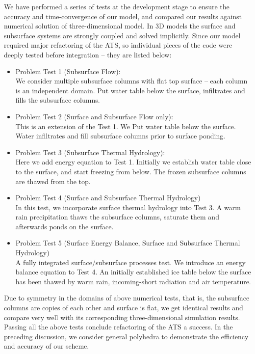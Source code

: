 \documentclass[review]{elsarticle}
\begin{document}
We have performed a series of tests at the development stage to ensure the accuracy and time-convergence of our model, and compared our results against numerical solution of three-dimensional model. In 3D models the surface and subsurface systems are strongly coupled and solved implicitly. Since our model required major refactoring of the ATS, so individual pieces of the code were deeply tested before integration -- they are listed below:
\begin{itemize}
\item{ Problem Test 1 (Subsurface Flow): \\
We consider multiple subsurface columns with flat top surface -- each column is an independent domain. Put water table below the surface, infiltrates and fills the subsurface columns.
}
\item{ Problem Test 2 (Surface and Subsurface Flow only): \\
This is an extension of the Test 1. We Put water table below the surface. Water infiltrates and fill subsurface columns prior to surface ponding. 
}

\item{ Problem Test 3 (Subsurface Thermal Hydrology): \\
Here we add energy equation to Test 1. Initially we establish water table close to the surface, and start freezing from below. The frozen subsurface columns are thawed from the top.}

\item{ Problem Test 4 (Surface and Subsurface Thermal Hydrology) \\
In this test, we incorporate surface thermal hydrology into Test 3. A warm rain precipitation thaws the subsurface columns, saturate them and afterwards ponds on the surface.}

\item{ Problem Test 5 (Surface Energy Balance, Surface and Subsurface Thermal Hydrology) \\
A fully integrated surface/subsurface processes test. We introduce an energy balance equation to Test 4. An initially established ice table below the surface has been thawed by warm rain, incoming-short radiation and air temperature.}

\end{itemize}
Due to symmetry in the domains of above numerical tests, that is, the subsurface columns are copies of each other and surface is flat, we get identical results and compare very well with its corresponding three-dimensional simulation results. Passing all the above tests conclude refactoring of the ATS a success. In the preceding discussion, we consider general polyhedra to demonstrate the efficiency and accuracy of our scheme.
\end{document}
